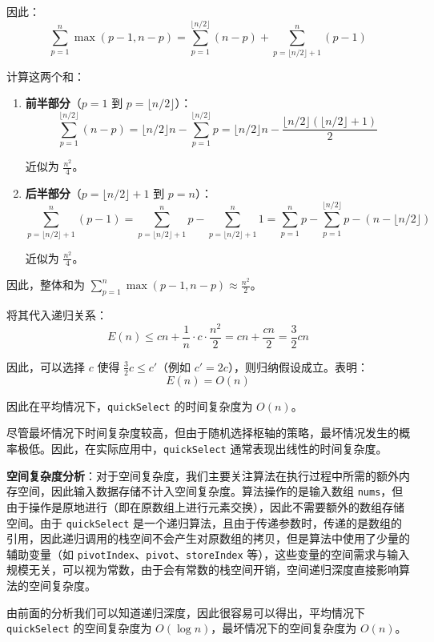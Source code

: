 因此：\[
\sum_{p=1}^{n} \max(p - 1, n - p) = \sum_{p=1}^{\lfloor n/2 \rfloor} (n - p) + \sum_{p=\lfloor n/2 \rfloor + 1}^{n} (p - 1)
\]

计算这两个和：\begin{enumerate}
    \item \textbf{前半部分}（\( p = 1 \) 到 \( p = \lfloor n/2 \rfloor \)）：\[
    \sum_{p=1}^{\lfloor n/2 \rfloor} (n - p) = \lfloor n/2 \rfloor n - \sum_{p=1}^{\lfloor n/2 \rfloor} p = \lfloor n/2 \rfloor n - \frac{\lfloor n/2 \rfloor (\lfloor n/2 \rfloor + 1)}{2}
    \]
    
    近似为 \( \frac{n^2}{4} \)。
    
    \item \textbf{后半部分}（\( p = \lfloor n/2 \rfloor + 1 \) 到 \( p = n \)）：\[
    \sum_{p=\lfloor n/2 \rfloor + 1}^{n} (p - 1) = \sum_{p=\lfloor n/2 \rfloor + 1}^{n} p - \sum_{p=\lfloor n/2 \rfloor + 1}^{n} 1 = \sum_{p=1}^{n} p - \sum_{p=1}^{\lfloor n/2 \rfloor} p - (n - \lfloor n/2 \rfloor)
    \]

    近似为 \( \frac{n^2}{4} \)。
\end{enumerate}

因此，整体和为 \( \sum_{p=1}^{n} \max(p - 1, n - p) \approx \frac{n^2}{2} \)。

将其代入递归关系：\[
E(n) \leq c n + \frac{1}{n} \cdot c \cdot \frac{n^2}{2} = c n + \frac{c n}{2} = \frac{3}{2} c n
\]

因此，可以选择 \( c \) 使得 \( \frac{3}{2} c \leq c' \)（例如 \( c' = 2c \)），则归纳假设成立。表明：\[
E(n) = O(n)
\]

因此在平均情况下，\texttt{quickSelect} 的时间复杂度为 \( O(n) \)。

尽管最坏情况下时间复杂度较高，但由于随机选择枢轴的策略，最坏情况发生的概率极低。因此，在实际应用中，\texttt{quickSelect} 通常表现出线性的时间复杂度。

\textbf{空间复杂度分析}：对于空间复杂度，我们主要关注算法在执行过程中所需的额外内存空间，因此输入数据存储不计入空间复杂度。算法操作的是输入数组 \texttt{nums}，但由于操作是原地进行（即在原数组上进行元素交换），因此不需要额外的数组存储空间。由于 \texttt{quickSelect} 是一个递归算法，且由于传递参数时，传递的是数组的引用，因此递归调用的栈空间不会产生对原数组的拷贝，但是算法中使用了少量的辅助变量（如 \texttt{pivotIndex}、\texttt{pivot}、\texttt{storeIndex} 等），这些变量的空间需求与输入规模无关，可以视为常数，由于会有常数的栈空间开销，空间递归深度直接影响算法的空间复杂度。

由前面的分析我们可以知道递归深度，因此很容易可以得出，平均情况下 \texttt{quickSelect} 的空间复杂度为 \( O(\log n) \)，最坏情况下的空间复杂度为 \( O(n) \)。

